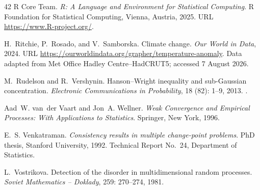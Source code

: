 \documentclass[12pt, a4paper]{article}
\begin{document}
\begin{thebibliography}{42}
{R Core Team}.
\newblock \emph{R: A Language and Environment for Statistical Computing}.
\newblock R Foundation for Statistical Computing, Vienna, Austria, 2025.
\newblock URL \url{https://www.R-project.org/}.

H.~Ritchie, P.~Rosado, and V.~Samborska.
\newblock Climate change.
\newblock \emph{Our World in Data}, 2024.
\newblock URL \url{https://ourworldindata.org/grapher/temperature-anomaly}.
\newblock Data adapted from Met Office Hadley Centre--HadCRUT5; accessed 7
  August 2026.

M.~Rudelson and R.~Vershynin.
\newblock Hanson--{W}right inequality and sub-{G}aussian concentration.
\newblock \emph{Electronic Communications in Probability}, 18
  (82): 1--9, 2013.
\newblock {}.

Aad~W. van~der Vaart and Jon~A. Wellner.
\newblock \emph{Weak Convergence and Empirical Processes: With Applications to
  Statistics}.
\newblock Springer, New York, 1996.

E.~S. Venkatraman.
\newblock \emph{Consistency results in multiple change-point problems}.
\newblock PhD thesis, Stanford University, 1992.
\newblock Technical Report No.\ 24, Department of Statistics.

L.~Vostrikova.
\newblock Detection of the disorder in multidimensional random processes.
\newblock \emph{Soviet Mathematics -- Doklady}, 259: 270--274, 1981.

\end{thebibliography}
\end{document}
